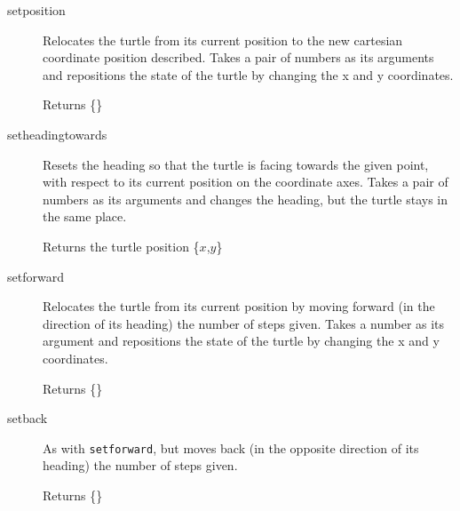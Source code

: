 \begin{description}
 \item[setposition] Relocates the turtle from its current position to the 
       new cartesian coordinate position described. Takes a pair of
       numbers as its arguments and repositions the state of the turtle by 
       changing the x and y coordinates.

       Returns \{\}


 \item[setheadingtowards] Resets the heading so that the turtle is facing
       towards the given point, with respect to its current position on
       the coordinate axes. Takes a pair of numbers as its arguments and
       changes the heading, but the turtle stays in the same place.

       Returns the turtle position \{$x$,$y$\}


 \item[setforward] Relocates the turtle from its current position by
       moving forward (in the direction of its heading) the number of
       steps given. Takes a number as its argument and repositions the
       state of the turtle by changing the x and y coordinates.

       Returns \{\}


 \item[setback] As with \texttt{setforward}, but moves back (in the opposite
       direction of its heading) the number of steps given.

       Returns \{\}


\end{description}

